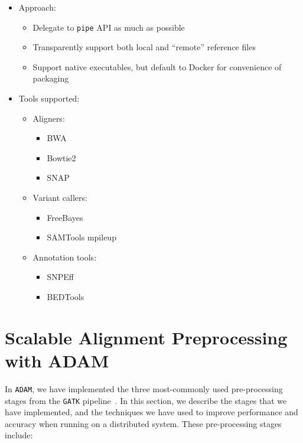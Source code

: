 \documentclass[phd]{ucbthesis}
\begin{document}
\begin{itemize}
\item Approach:
  \begin{itemize}
  \item Delegate to \texttt{pipe} API as much as possible
  \item Transparently support both local and ``remote'' reference files
  \item Support native executables, but default to Docker for convenience of packaging
  \end{itemize}
\item Tools supported:
  \begin{itemize}
  \item Aligners:
    \begin{itemize}
    \item BWA
    \item Bowtie2
    \item SNAP
    \end{itemize}
  \item Variant callers:
    \begin{itemize}
    \item FreeBayes
    \item SAMTools mpileup
    \end{itemize}
  \item Annotation tools:
    \begin{itemize}
    \item SNPEff
    \item BEDTools
    \end{itemize}
  \end{itemize}
\end{itemize}

\chapter{Scalable Alignment Preprocessing with \textsc{ADAM}}
\label{chap:adam}

In \texttt{ADAM}, we have implemented the three most-commonly used pre-processing stages from the
\texttt{GATK} pipeline~\cite{depristo11}. In this section, we describe the stages that we have
implemented, and the techniques we have used to improve performance and accuracy when running on
a distributed system. These pre-processing stages include:
\end{document}
